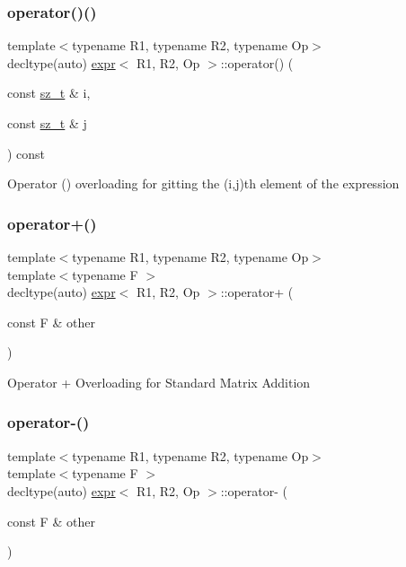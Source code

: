 \subsubsection{\texorpdfstring{operator()()}{operator()()}}
{\footnotesize\ttfamily template$<$typename R1, typename R2, typename Op$>$ \\
decltype(auto) \mbox{\hyperlink{classexpr}{expr}}$<$ R1, R2, Op $>$\+::operator() (\begin{DoxyParamCaption}\item[{const \mbox{\hyperlink{lazy__matrix_8h_acba2745dcfc55b2d05ff45adc6a0a015}{sz\+\_\+t}} \&}]{i,  }\item[{const \mbox{\hyperlink{lazy__matrix_8h_acba2745dcfc55b2d05ff45adc6a0a015}{sz\+\_\+t}} \&}]{j }\end{DoxyParamCaption}) const\hspace{0.3cm}{\ttfamily [inline]}}

Operator () overloading for gitting the (i,j)th element of the expression \mbox{\label{classexpr_a252251779aa235aed7a5a7fec6ebe995}} 
\subsubsection{\texorpdfstring{operator+()}{operator+()}}
{\footnotesize\ttfamily template$<$typename R1, typename R2, typename Op$>$ \\
template$<$typename F $>$ \\
decltype(auto) \mbox{\hyperlink{classexpr}{expr}}$<$ R1, R2, Op $>$\+::operator+ (\begin{DoxyParamCaption}\item[{const F \&}]{other }\end{DoxyParamCaption})\hspace{0.3cm}{\ttfamily [inline]}}

Operator + Overloading for Standard Matrix Addition \mbox{\label{classexpr_ab46b7e78ad487b606b12e81c24cb3eeb}} 
\subsubsection{\texorpdfstring{operator-\/()}{operator-()}}
{\footnotesize\ttfamily template$<$typename R1, typename R2, typename Op$>$ \\
template$<$typename F $>$ \\
decltype(auto) \mbox{\hyperlink{classexpr}{expr}}$<$ R1, R2, Op $>$\+::operator-\/ (\begin{DoxyParamCaption}\item[{const F \&}]{other }\end{DoxyParamCaption})\hspace{0.3cm}{\ttfamily [inline]}}

